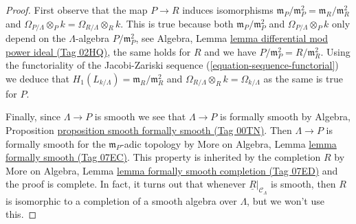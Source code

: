 \documentclass{amsart}
\theoremstyle{plain}
\theoremstyle{definition}
\theoremstyle{remark}
\numberwithin{equation}{subsection}
\begin{document}
\begin{proof}
\medskip\noindent
First observe that the map $P \to R$ induces isomorphisms
$\mathfrak m_P/\mathfrak m_P^2 = \mathfrak m_R/\mathfrak m_R^2$
and $\Omega_{P/\Lambda} \otimes_P k = \Omega_{R/\Lambda} \otimes_R k$.
This is true because both $\mathfrak m_P/\mathfrak m_P^2$
and $\Omega_{P/\Lambda} \otimes_P k$ only depend on the
$\Lambda$-algebra $P/\mathfrak m_P^2$, see
Algebra, Lemma \href{https://stacks.math.columbia.edu/tag/02HQ}{lemma differential mod power ideal (Tag 02HQ)},
the same holds for $R$ and we have $P/\mathfrak m_P^2 = R/\mathfrak m_R^2$.
Using the functoriality of the Jacobi-Zariski sequence
(\ref{equation-sequence-functorial})
we deduce that $H_1(L_{k/\Lambda}) = \mathfrak m_R/\mathfrak m_R^2$ and
$\Omega_{R/\Lambda} \otimes_R k = \Omega_{k/\Lambda}$
as the same is true for $P$.

\medskip\noindent
Finally, since $\Lambda \to P$ is smooth we see that
$\Lambda \to P$ is formally smooth by
Algebra, Proposition \href{https://stacks.math.columbia.edu/tag/00TN}{proposition smooth formally smooth (Tag 00TN)}.
Then $\Lambda \to P$ is formally smooth for the $\mathfrak m_P$-adic
topology by More on Algebra, Lemma \href{https://stacks.math.columbia.edu/tag/07EC}{lemma formally smooth (Tag 07EC)}.
This property is inherited by the completion $R$ by
More on Algebra, Lemma \href{https://stacks.math.columbia.edu/tag/07ED}{lemma formally smooth completion (Tag 07ED)}
and the proof is complete.
In fact, it turns out that whenever $\underline{R}|_{\mathcal{C}_\Lambda}$
is smooth, then $R$ is isomorphic to a completion of a smooth
algebra over $\Lambda$, but we won't use this.
\end{proof}
\end{document}
